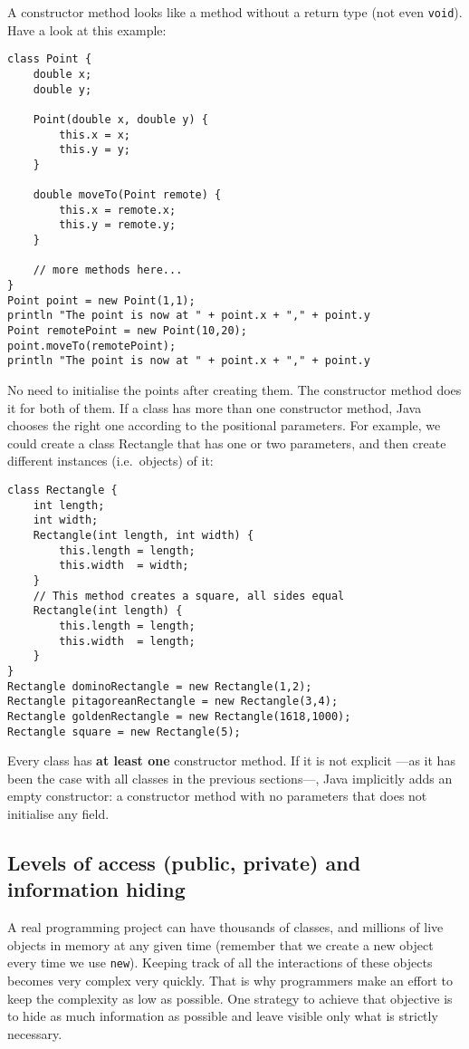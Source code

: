 A constructor method looks like a method without a return type (not
even \verb+void+). Have a look at this example:

\begin{verbatim}
class Point {
    double x;
    double y;
    
    Point(double x, double y) {
        this.x = x;
        this.y = y;
    }
    
    double moveTo(Point remote) {
        this.x = remote.x;
        this.y = remote.y;
    }
    
    // more methods here...
}
Point point = new Point(1,1);
println "The point is now at " + point.x + "," + point.y
Point remotePoint = new Point(10,20);
point.moveTo(remotePoint);
println "The point is now at " + point.x + "," + point.y
\end{verbatim}

No need to initialise the points after creating them. The constructor
method does it for both of them. 
If a class has more than one constructor method, Java chooses the
right one according to the positional parameters. For example, we
could create a class Rectangle that has one or two parameters, and
then create different instances (i.e.~objects) of it: 

\begin{verbatim}
class Rectangle {
    int length;
    int width;
    Rectangle(int length, int width) {
        this.length = length;
        this.width  = width;
    }
    // This method creates a square, all sides equal
    Rectangle(int length) {
        this.length = length;
        this.width  = length;
    }
}
Rectangle dominoRectangle = new Rectangle(1,2);
Rectangle pitagoreanRectangle = new Rectangle(3,4);
Rectangle goldenRectangle = new Rectangle(1618,1000);
Rectangle square = new Rectangle(5); 
\end{verbatim}

Every class has 
\textbf{at least one} constructor method. 
If it is not explicit ---as it has been
the case with all classes in the previous sections---, Java 
implicitly adds an empty
constructor: a constructor method with no parameters that does not
initialise any field. 


\subsection{Levels of access (public, private) and information hiding}
\label{sec:levels-access-inform}

A real programming project can have thousands of classes, and millions
of live objects in memory at any given time (remember that we create a
new object every time we use \verb+new+). Keeping track of all the
interactions of these objects becomes very complex very quickly. That
is why programmers make an effort to keep 
the complexity as low as possible. One
strategy to achieve that objective is 
to hide as much information as possible
and leave visible only what is strictly necessary. 

